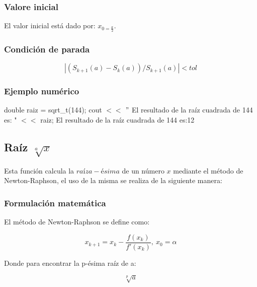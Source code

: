\documentclass[10pt,a4paper]{article}
\begin{document}
	
	\subsubsection{Valore inicial}
	El valor inicial está dado por: $x_{0 = \frac{a}{2}}$.
	\subsubsection{Condición de parada}
	
	\begin{equation}\label{key22}
		\left\lvert (S_{k+1}(a) - S_{k}(a)) / S_{k+1}(a) \right\lvert < tol
	\end{equation}
	
	\subsubsection{Ejemplo numérico}
	double raiz = sqrt{\_}t(144); \newline
	cout $<<$ $"$ El resultado de la raíz cuadrada de 144 es: " $<<$ raiz; \newline
	El resultado de la raíz cuadrada de 144 es:12\newline
	
	
	\subsection{Raíz $\sqrt[a]{x}$}
	
	Esta función calcula la $raíz a-ésima$ de un número $x$ mediante el método de Newton-Raphson, el uso de la misma se realiza de la siguiente manera:
	
	\begin{center}
	\end{center}
	
	\subsubsection{Formulación matemática}

	El método de Newton-Raphson se define como:
	
	\begin{equation}\label{key23}
		x_{k+1} = x_{k} - \frac{f(x_{k})}{f'(x_{k})}, ~x_{0} = \alpha
	\end{equation}
	
	Donde para encontrar la p-ésima raíz de a:
	
	\begin{equation}\label{key24}
		\sqrt[p]{a}	
	\end{equation}
\end{document}
